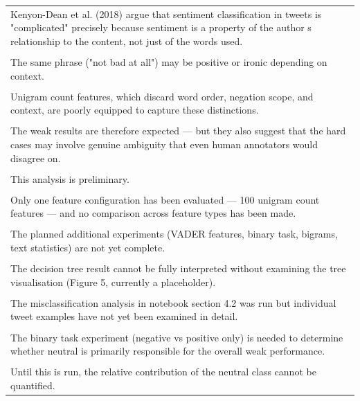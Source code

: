 \documentclass[11pt]{article}
\begin{document}
\begin{longtable}{|p{\dimexpr\linewidth-2\tabcolsep-2\arrayrulewidth\relax}|}
\hline
\rule{0pt}{3.5cm} \\
\hline
Kenyon-Dean et al. (2018) argue that sentiment classification in tweets is "complicated" precisely because sentiment is a property of the author s relationship to the content, not just of the words used. \\[2pt]
\hline
\rule{0pt}{3.5cm} \\
\hline
The same phrase ("not bad at all") may be positive or ironic depending on context. \\[2pt]
\hline
\rule{0pt}{3.5cm} \\
\hline
Unigram count features, which discard word order, negation scope, and context, are poorly equipped to capture these distinctions. \\[2pt]
\hline
\rule{0pt}{3.5cm} \\
\hline
The weak results are therefore expected --- but they also suggest that the hard cases may involve genuine ambiguity that even human annotators would disagree on. \\[2pt]
\hline
\rule{0pt}{3.5cm} \\
\hline
This analysis is preliminary. \\[2pt]
\hline
\rule{0pt}{3.5cm} \\
\hline
Only one feature configuration has been evaluated --- 100 unigram count features --- and no comparison across feature types has been made. \\[2pt]
\hline
\rule{0pt}{3.5cm} \\
\hline
The planned additional experiments (VADER features, binary task, bigrams, text statistics) are not yet complete. \\[2pt]
\hline
\rule{0pt}{3.5cm} \\
\hline
The decision tree result cannot be fully interpreted without examining the tree visualisation (Figure 5, currently a placeholder). \\[2pt]
\hline
\rule{0pt}{3.5cm} \\
\hline
The misclassification analysis in notebook section 4.2 was run but individual tweet examples have not yet been examined in detail. \\[2pt]
\hline
\rule{0pt}{3.5cm} \\
\hline
The binary task experiment (negative vs positive only) is needed to determine whether neutral is primarily responsible for the overall weak performance. \\[2pt]
\hline
\rule{0pt}{3.5cm} \\
\hline
Until this is run, the relative contribution of the neutral class cannot be quantified. \\[2pt]

\end{longtable}
\end{document}

